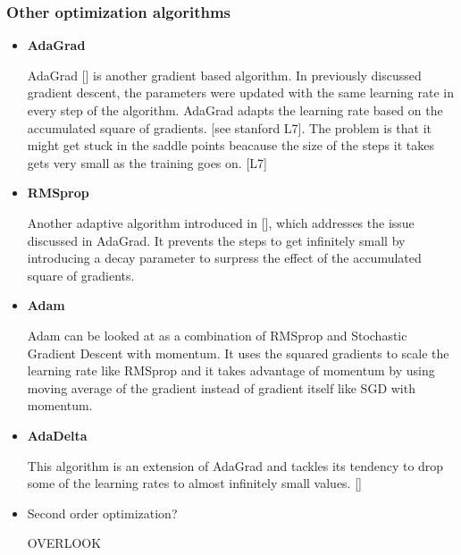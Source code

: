 
\subsubsection{Other optimization algorithms}
\begin{itemize}
	\item \textbf{AdaGrad}
	
	AdaGrad [] is another gradient based algorithm. In previously discussed gradient descent, the parameters were updated with the same learning rate in every step of the algorithm. AdaGrad adapts the learning rate based on the accumulated square of gradients. [see stanford L7]. The problem is that it might get stuck in the saddle points beacause the size of the steps it takes gets very small as the training goes on. [L7]
	
	\item \textbf{RMSprop}
	
	Another adaptive algorithm introduced in [], which addresses the issue discussed in AdaGrad. It prevents the steps to get infinitely small by introducing a decay parameter to surpress the effect of the accumulated square of gradients.	
	
	\item \textbf{Adam}
	
	Adam can be looked at as a combination of RMSprop and Stochastic Gradient Descent with momentum. It uses the squared gradients to scale the learning rate like RMSprop and it takes advantage of momentum by using moving average of the gradient instead of gradient itself like SGD with momentum. %
	
	\item \textbf{AdaDelta}
	
	This algorithm is an extension of AdaGrad and tackles its tendency to drop some of the learning rates to almost infinitely small values. []
	
	\item Second order optimization?
	
	OVERLOOK
\end{itemize}

